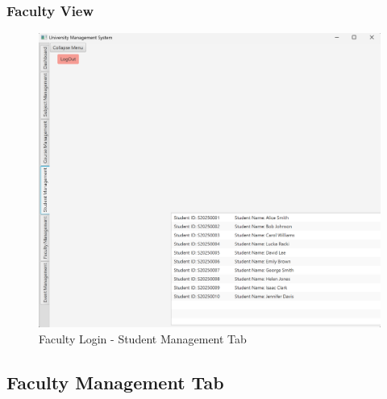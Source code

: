 \newpage
\subsubsection{Faculty View}

\lipsum[9]


\begin{figure}[ht]
    \centering
        \centering\includegraphics[width=0.7\linewidth]{figures/FAC_Student_Management_Tab.png}
        \caption{Faculty Login - Student Management Tab}
\end{figure}







\newpage
\subsection{Faculty Management Tab}

